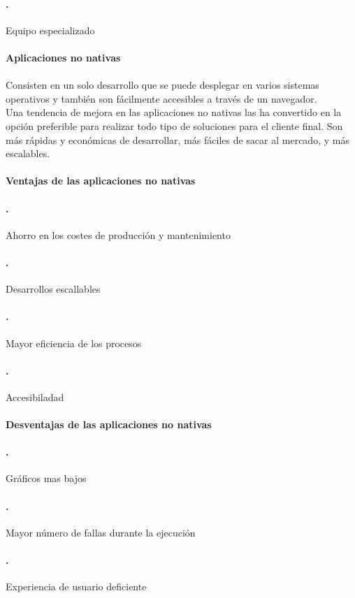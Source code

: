 \documentclass[12pt,a4paper]{article}
\begin{document}
\paragraph{.}
Equipo especializado
\paragraph{}
\paragraph{}
\paragraph{}
\paragraph{Aplicaciones no nativas}
\paragraph{}
Consisten en un solo desarrollo que se puede desplegar en varios sistemas operativos y también son fácilmente accesibles a través de un navegador.\\
Una tendencia de mejora en las aplicaciones no nativas las ha convertido en la opción preferible para realizar todo tipo de soluciones para el cliente final. Son más rápidas y económicas de desarrollar, más fáciles de sacar al mercado, y más escalables.
\paragraph{Ventajas de las aplicaciones no nativas}
\paragraph{.}
Ahorro en los costes de producción y mantenimiento
\paragraph{.}
Desarrollos escallables
\paragraph{.}
Mayor eficiencia de los procesos
\paragraph{.}
Accesibiladad
\paragraph{Desventajas de las aplicaciones no nativas}
\paragraph{.}
Gráficos mas bajos
\paragraph{.}
Mayor número de fallas durante la ejecución
\paragraph{.}
Experiencia de usuario deficiente
\end{document}
